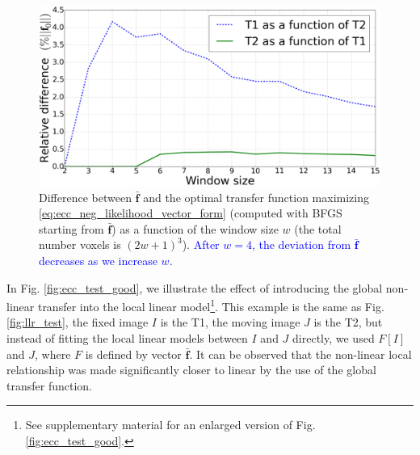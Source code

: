 \begin{figure}[t]
\centering
    \includegraphics[width=1.0\linewidth]{images/LLR_transfer_rmse_centered.png}
    \caption{{\small Difference between $\mathbf{\bar{f}}$ and the optimal transfer function maximizing \eqref{eq:ecc_neg_likelihood_vector_form} (computed with BFGS starting from $\mathbf{\bar{f}}$) as a function of the window size $w$ (the total number voxels is $(2w+1)^{3}$). \textcolor{blue}{After $w=4$, the deviation from $\mathbf{\bar{f}}$ decreases as we increase $w$.}}}
\label{fig:LLR_transfer_rmse}\figcloser
\end{figure}
In Fig. \ref{fig:ecc_test_good}, we illustrate the effect of introducing the global non-linear transfer into the local linear model\footnote{See supplementary material for an enlarged version of Fig. \ref{fig:ecc_test_good}.}. This example is the same as Fig. \ref{fig:llr_test}, the fixed image $I$ is the T1, the moving image $J$ is the T2, but instead of fitting the local linear models between $I$ and $J$ directly, we used $F[I]$ and $J$, where $F$ is defined by vector $\mathbf{\bar{f}}$. It can be observed that the non-linear local relationship was made significantly closer to linear by the use of the global transfer function.
